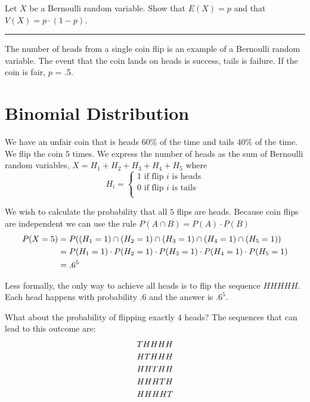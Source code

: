 \documentclass[
]{book}
\theoremstyle{definition}
\theoremstyle{definition}
\theoremstyle{definition}
\theoremstyle{remark}
\let\BeginKnitrBlock\begin \let\EndKnitrBlock\end
\begin{document}
\BeginKnitrBlock{exercise}
\protect\hypertarget{exr:bernoulli}{}{\label{exr:bernoulli} }Let \(X\) be a Bernoulli random variable. Show that \(E(X)=p\) and that \(V(X)=p \cdot (1-p)\).
\EndKnitrBlock{exercise}

\begin{center}\rule{0.5\linewidth}{0.5pt}\end{center}

The number of heads from a single coin flip is an example of a Bernoulli random variable. The event that the coin lands on heads is success, tails is failure. If the coin is fair, \(p\) = .5.

\hypertarget{binomial-distribution}{%
\section{Binomial Distribution}\label{binomial-distribution}}

We have an unfair coin that is heads \(60\%\) of the time and tails \(40\%\) of the time. We flip the coin \(5\) times. We express the number of heads as the sum of Bernoulli random variables, \(X = H_1 + H_2 + H_3 + H_4 + H_5\) where
\begin{equation*} 
    H_i =
    \left\{
        \begin{array}{cc}
                1 \text{ if flip } i \text{ is heads} \\
                0 \text{ if flip } i \text{ is tails} \\
        \end{array} 
    \right.
\end{equation*}

We wish to calculate the probability that all \(5\) flips are heads. Because coin flips are independent we can use the rule \(P(A \cap B) = P(A) \cdot P(B)\)
\begin{align} 
P(X=5) &= P((H_1=1) \cap (H_2=1) \cap (H_3=1) \cap (H_4=1) \cap (H_5=1)) \notag \\
&=P(H_1=1) \cdot P(H_2=1) \cdot P(H_3=1) \cdot P(H_4=1) \cdot P(H_5=1)  \notag \\
&= .6^5 \notag
\end{align}

Less formally, the only way to achieve all heads is to flip the sequence \(HHHHH\). Each head happens with probability \(.6\) and the answer is \(.6^5\).

What about the probability of flipping exactly \(4\) heads? The sequences that can lead to this outcome are:
\begin{align} 
THHHH \notag \\
HTHHH  \notag \\
HHTHH \notag \\
HHHTH \notag \\
HHHHT \notag
\end{align}
\end{document}
